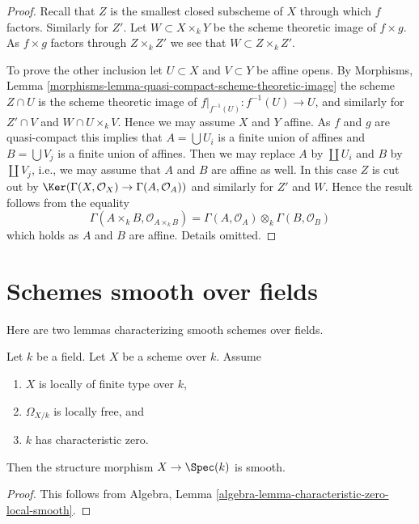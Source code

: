 \begin{proof}
Recall that $Z$ is the smallest closed subscheme of $X$ through which
$f$ factors. Similarly for $Z'$. Let $W \subset X \times_k Y$ be the
scheme theoretic image of $f \times g$. As $f \times g$ factors through
$Z \times_k Z'$ we see that $W \subset Z \times_k Z'$.

\medskip\noindent
To prove the other inclusion let $U \subset X$ and $V \subset Y$ be
affine opens. By
Morphisms, Lemma \ref{morphisms-lemma-quasi-compact-scheme-theoretic-image}
the scheme $Z \cap U$ is the scheme theoretic image of
$f|_{f^{-1}(U)} : f^{-1}(U) \to U$, and similarly for
$Z' \cap V$ and $W \cap U \times_k V$. Hence we may assume
$X$ and $Y$ affine. As $f$ and $g$ are quasi-compact this implies
that $A = \bigcup U_i$ is a finite union of affines and
$B = \bigcup V_j$ is a finite union of affines.
Then we may replace $A$ by $\coprod U_i$ and $B$ by
$\coprod V_j$, i.e., we may assume that $A$ and $B$ are affine as well.
In this case $Z$ is cut out by
$\Ker(\Gamma(X, \mathcal{O}_X) \to \Gamma(A, \mathcal{O}_A))$
and similarly for $Z'$ and $W$. Hence the result follows from
the equality
$$
\Gamma(A \times_k B, \mathcal{O}_{A \times_k B})
=
\Gamma(A, \mathcal{O}_A) \otimes_k \Gamma(B, \mathcal{O}_B)
$$
which holds as $A$ and $B$ are affine. Details omitted.
\end{proof}





\section{Schemes smooth over fields}
\label{section-smooth}

\noindent
Here are two lemmas characterizing smooth schemes over fields.

\begin{lemma}
\label{lemma-char-zero-differentials-free-smooth}
Let $k$ be a field. Let $X$ be a scheme over $k$.
Assume
\begin{enumerate}
\item $X$ is locally of finite type over $k$,
\item $\Omega_{X/k}$ is locally free, and
\item $k$ has characteristic zero.
\end{enumerate}
Then the structure morphism $X \to \Spec(k)$ is smooth.
\end{lemma}

\begin{proof}
This follows from
Algebra, Lemma \ref{algebra-lemma-characteristic-zero-local-smooth}.
\end{proof}

